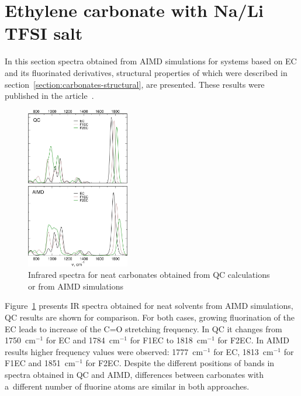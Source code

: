 \section{Ethylene carbonate with Na/Li TFSI salt}
\label{section:carbonates-spectra}

In this section spectra obtained from AIMD simulations for systems based on EC and its fluorinated derivatives, structural properties of which were described in section~\ref{section:carbonates-structural}, are presented. These results were published in the article~\cite{carbonates}.

\begin{figure}[ht]
    \centering
    \includegraphics[width=0.4\textwidth]{img/4-ir-spectra-from-aimd-simulations/3-carbonates/ir-neat-solvents.png}
    \caption{Infrared spectra for neat carbonates obtained from QC calculations or from AIMD simulations}
    \label{fig:carbonates-ir-neat-solvents}
\end{figure}

Figure~\ref{fig:carbonates-ir-neat-solvents} presents IR spectra obtained for neat solvents from AIMD simulations, QC results are shown for comparison. For both cases, growing fluorination of the EC leads to increase of the C=O stretching frequency. In QC it changes from 1750~cm$^{-1}$ for EC and 1784~cm$^{-1}$ for F1EC to 1818~cm$^{-1}$ for F2EC. In AIMD results higher frequency values were observed: 1777~cm$^{-1}$ for EC, 1813~cm$^{-1}$ for F1EC and 1851~cm$^{-1}$ for F2EC. Despite the different positions of bands in spectra obtained in QC and AIMD, differences between carbonates with a~different number of fluorine atoms are similar in both approaches.

